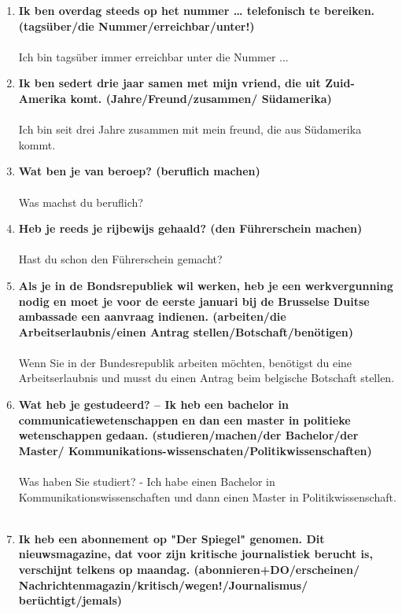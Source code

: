 \documentclass[main.tex]{subfiles}
\begin{document}
\begin{enumerate}
\item \textbf{Ik ben overdag steeds op het nummer … telefonisch te bereiken. (tagsüber/die Nummer/erreichbar/unter!)}\\ \\
Ich bin tagsüber immer erreichbar unter die Nummer ...
\\
\item \textbf{Ik ben sedert drie jaar samen met mijn vriend, die uit Zuid-Amerika komt. (Jahre/Freund/zusammen/ Südamerika)}\\ \\
Ich bin seit drei Jahre zusammen mit mein freund, die aus Südamerika kommt.
\\
\item \textbf{Wat ben je van beroep? (beruflich machen)}\\ \\
Was machst du beruflich?
\\
\item \textbf{Heb je reeds je rijbewijs gehaald? (den Führerschein machen)}\\ \\
Hast du schon den Führerschein gemacht?
\\
\item \textbf{Als je in de Bondsrepubliek wil werken, heb je een werkvergunning nodig en moet je voor de eerste januari bij de Brusselse Duitse ambassade een aanvraag indienen. (arbeiten/die Arbeitserlaubnis/einen Antrag stellen/Botschaft/benötigen)}\\ \\
Wenn Sie in der Bundesrepublik arbeiten möchten, benötigst du eine Arbeitserlaubnis und musst du einen Antrag beim belgische Botschaft stellen.
\\
\item \textbf{Wat heb je gestudeerd? – Ik heb een bachelor in communicatiewetenschappen en dan een master in politieke wetenschappen gedaan. (studieren/machen/der Bachelor/der Master/ Kommunikations-wissenschaten/Politikwissenschaften)}\\ \\
Was haben Sie studiert? - Ich habe einen Bachelor in Kommunikationswissenschaften und dann einen Master in Politikwissenschaft.
\\
\\
\item \textbf{Ik heb een abonnement op "Der Spiegel" genomen. Dit nieuwsmagazine, dat voor zijn kritische journalistiek berucht is, verschijnt telkens op maandag. (abonnieren+DO/erscheinen/ Nachrichtenmagazin/kritisch/wegen!/Journalismus/ berüchtigt/jemals)}\\ \\

\end{enumerate}
\end{document}
